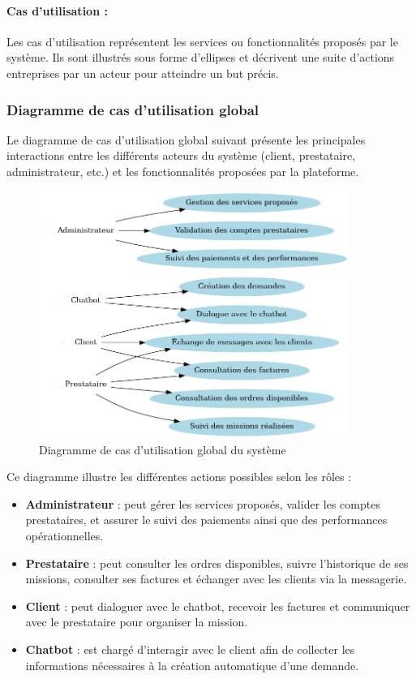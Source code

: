 \paragraph*{Cas d’utilisation :}
Les cas d’utilisation représentent les services ou fonctionnalités proposés par le système. Ils sont illustrés sous forme d’ellipses et décrivent une suite d’actions entreprises par un acteur pour atteindre un but précis.

\subsubsection*{Diagramme de cas d’utilisation global}

Le diagramme de cas d’utilisation global suivant présente les principales interactions entre les différents acteurs du système (client, prestataire, administrateur, etc.) et les fonctionnalités proposées par la plateforme.

\begin{figure}[H]
    \centering
    \includegraphics[width=0.9\textwidth]{figures/use_case_global.png} %
    \caption{Diagramme de cas d’utilisation global du système}
    \label{fig:usecase_global}
\end{figure}
\medskip

\noindent
Ce diagramme illustre les différentes actions possibles selon les rôles :
\begin{itemize}
    \item \textbf{Administrateur} : peut gérer les services proposés, valider les comptes prestataires, et assurer le suivi des paiements ainsi que des performances opérationnelles.
    \item \textbf{Prestataire} : peut consulter les ordres disponibles, suivre l’historique de ses missions, consulter ses factures et échanger avec les clients via la messagerie.
    \item \textbf{Client} : peut dialoguer avec le chatbot, recevoir les factures et communiquer avec le prestataire pour organiser la mission.
    \item \textbf{Chatbot} : est chargé d’interagir avec le client afin de collecter les informations nécessaires à la création automatique d’une demande.
\end{itemize}
